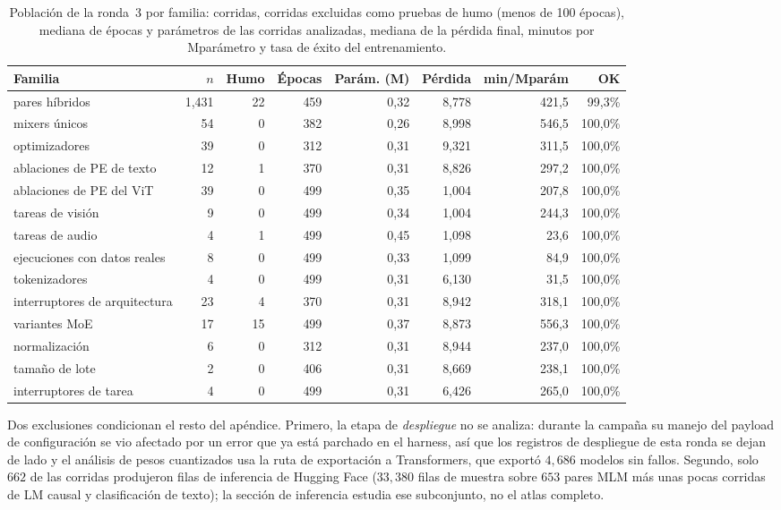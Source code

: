 \begin{table}[H]
\centering
\small
\caption{Población de la ronda~3 por familia: corridas, corridas excluidas como pruebas de humo (menos de 100 épocas), mediana de épocas y parámetros de las corridas analizadas, mediana de la pérdida final, minutos por Mparámetro y tasa de éxito del entrenamiento.}
\label{tab:r3-families}
\begin{tabular}{lrrrrrrr}
\toprule
Familia & $n$ & Humo & Épocas & Parám. (M) & Pérdida & min/Mparám & OK \\
\midrule
pares híbridos & 1{,}431 & 22 & 459 & 0,32 & 8,778 & 421,5 & 99,3\% \\
mixers únicos & 54 & 0 & 382 & 0,26 & 8,998 & 546,5 & 100,0\% \\
optimizadores & 39 & 0 & 312 & 0,31 & 9,321 & 311,5 & 100,0\% \\
ablaciones de PE de texto & 12 & 1 & 370 & 0,31 & 8,826 & 297,2 & 100,0\% \\
ablaciones de PE del ViT & 39 & 0 & 499 & 0,35 & 1,004 & 207,8 & 100,0\% \\
tareas de visión & 9 & 0 & 499 & 0,34 & 1,004 & 244,3 & 100,0\% \\
tareas de audio & 4 & 1 & 499 & 0,45 & 1,098 & 23,6 & 100,0\% \\
ejecuciones con datos reales & 8 & 0 & 499 & 0,33 & 1,099 & 84,9 & 100,0\% \\
tokenizadores & 4 & 0 & 499 & 0,31 & 6,130 & 31,5 & 100,0\% \\
interruptores de arquitectura & 23 & 4 & 370 & 0,31 & 8,942 & 318,1 & 100,0\% \\
variantes MoE & 17 & 15 & 499 & 0,37 & 8,873 & 556,3 & 100,0\% \\
normalización & 6 & 0 & 312 & 0,31 & 8,944 & 237,0 & 100,0\% \\
tamaño de lote & 2 & 0 & 406 & 0,31 & 8,669 & 238,1 & 100,0\% \\
interruptores de tarea & 4 & 0 & 499 & 0,31 & 6,426 & 265,0 & 100,0\% \\
\bottomrule
\end{tabular}
\end{table}

Dos exclusiones condicionan el resto del apéndice. Primero, la etapa de \emph{despliegue} no se analiza: durante la campaña su manejo del payload de configuración se vio afectado por un error que ya está parchado en el harness, así que los registros de despliegue de esta ronda se dejan de lado y el análisis de pesos cuantizados usa la ruta de exportación a Transformers, que exportó $4{,}686$ modelos sin fallos. Segundo, solo $662$ de las corridas produjeron filas de inferencia de Hugging Face ($33{,}380$ filas de muestra sobre $653$ pares MLM más unas pocas corridas de LM causal y clasificación de texto); la sección de inferencia estudia ese subconjunto, no el atlas completo.

